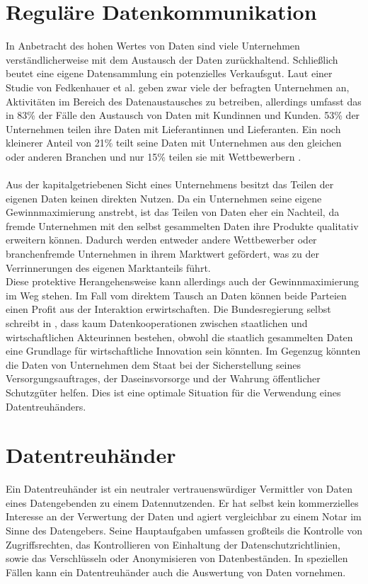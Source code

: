 \documentclass[
	fontsize=12pt,
	headings=small,
	parskip=half,           %
	bibliography=totoc,
	numbers=noenddot,       %
	open=any,               %
]{scrreprt}
\begin{document}
\section{Reguläre Datenkommunikation}
In Anbetracht des hohen Wertes von Daten sind viele Unternehmen verständlicherweise mit dem Austausch der Daten zurückhaltend. Schließlich beutet eine eigene Datensammlung ein potenzielles Verkaufsgut. Laut einer Studie von Fedkenhauer et al. geben zwar viele der befragten Unternehmen an, Aktivitäten im Bereich des Datenaustausches zu betreiben, allerdings umfasst das in 83\% der Fälle den Austausch von Daten mit Kundinnen und Kunden. 53\% der Unternehmen teilen ihre Daten mit Lieferantinnen und Lieferanten. Ein noch kleinerer Anteil von 21\% teilt seine Daten mit Unternehmen aus den gleichen oder anderen Branchen und nur 15\% teilen sie mit Wettbewerbern \cite{dt-fedkenhauer2017datenaustausch}. \\\\
Aus der kapitalgetriebenen Sicht eines Unternehmens besitzt das Teilen der eigenen Daten keinen direkten Nutzen. Da ein Unternehmen seine eigene Gewinnmaximierung anstrebt, ist das Teilen von Daten eher ein Nachteil, da fremde Unternehmen mit den selbst gesammelten Daten ihre Produkte qualitativ erweitern können. Dadurch werden entweder andere Wettbewerber oder branchenfremde Unternehmen in ihrem Marktwert gefördert, was zu der Verrinnerungen des eigenen Marktanteils führt. \\
Diese protektive Herangehensweise kann allerdings auch der Gewinnmaximierung im Weg stehen. Im Fall vom direktem Tausch an Daten können beide Parteien einen Profit aus der Interaktion erwirtschaften. Die Bundesregierung selbst schreibt in \cite{dt-bundesregierung2021datenstrategie}, dass kaum Datenkooperationen zwischen staatlichen und wirtschaftlichen Akteurinnen bestehen, obwohl die staatlich gesammelten Daten eine Grundlage für wirtschaftliche Innovation sein könnten. Im Gegenzug könnten die Daten von Unternehmen dem Staat bei der Sicherstellung seines Versorgungsauftrages, der Daseinsvorsorge und der Wahrung öffentlicher Schutzgüter helfen. Dies ist eine optimale Situation für die Verwendung eines Datentreuhänders.
\section{Datentreuhänder}
\label{sec:dt}
Ein Datentreuhänder ist ein neutraler vertrauenswürdiger Vermittler von Daten eines Datengebenden zu einem Datennutzenden. Er hat selbst kein kommerzielles Interesse an der Verwertung der Daten und agiert vergleichbar zu einem Notar im Sinne des Datengebers. Seine Hauptaufgaben umfassen großteils die Kontrolle von Zugriffsrechten, das Kontrollieren von Einhaltung der Datenschutzrichtlinien, sowie das Verschlüsseln oder Anonymisieren von Datenbeständen. In speziellen Fällen kann ein Datentreuhänder auch die Auswertung von Daten vornehmen. \cite{dt-bundesregierung2021datenstrategie}\cite{dt-richter2020ddvtalk}
\end{document}
